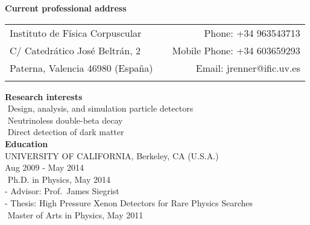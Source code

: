 \vspace{0.5cm}
{\noindent\textbf{Current professional address}}\\

\begin{tabular*}{\textwidth}{lcr}
Instituto de F\'isica Corpuscular & \hspace{1.2in} & Phone: +34 963543713\\
C/ Catedr\'atico Jos\'e Beltr\'an, 2 & & Mobile Phone: +34 603659293\\
Paterna, Valencia 46980 (Espa\~na) & & Email: jrenner@ific.uv.es\\
&&\\
\end{tabular*}

{\noindent\textbf{Research interests}}\\

\indent\hspace{0.2 cm}\textbullet\,\,Design, analysis, and simulation particle detectors\\
\indent\hspace{0.2 cm}\textbullet\,\,Neutrinoless double-beta decay\\
\indent\hspace{0.2 cm}\textbullet\,\,Direct detection of dark matter\\

{\noindent\textbf{Education}}\\

\indent\hspace{0.2 cm}UNIVERSITY OF CALIFORNIA, Berkeley, CA (U.S.A.)\\ 
\indent\hspace{0.2 cm}Aug 2009 - May 2014\\

\indent\hspace{0.2 cm}\hspace{0.6 cm}\textbullet\,\,Ph.D. in Physics, May 2014\\ %
\indent\hspace{0.2 cm}\hspace{1.2 cm}-\,\,Advisor: Prof.\ James Siegrist\\
\indent\hspace{0.2 cm}\hspace{1.2 cm}-\,\,Thesis: High Pressure Xenon Detectors for Rare Physics Searches\\
\indent\hspace{0.2 cm}\hspace{0.6 cm}\textbullet\,\,Master of Arts in Physics, May 2011\\

